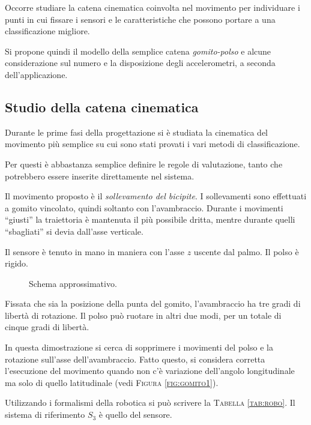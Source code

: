 Occorre studiare la catena cinematica coinvolta nel movimento
per individuare i punti in cui fissare i sensori
e le caratteristiche che possono portare a una classificazione migliore.

Si propone quindi il modello della semplice catena \emph{gomito-polso}
e alcune considerazione sul numero e la disposizione degli accelerometri,
a seconda dell'applicazione.

\subsection{Studio della catena cinematica}
\label{ssez:cat_cine}

Durante le prime fasi della progettazione
si è studiata la cinematica del movimento più semplice
su cui sono stati provati i vari metodi di classificazione.

Per questi è abbastanza semplice definire le regole di valutazione,
tanto che potrebbero essere inserite direttamente nel sistema.


Il movimento proposto è il \emph{sollevamento del bicipite}.
I sollevamenti sono effettuati a gomito vincolato,
quindi soltanto con l'avambraccio.
Durante i movimenti ``giusti'' la traiettoria \`e mantenuta
il pi\`u possibile dritta, mentre durante quelli ``sbagliati''
si devia dall'asse verticale.

Il sensore \`e tenuto in mano in maniera
con l'asse $z$ uscente dal palmo.
Il polso \`e rigido.

\begin{figure}
  \centering
	
  \caption{Schema approssimativo.}
  \label{fig:gomito2}
\end{figure}

Fissata che sia la posizione della punta del gomito,
l'avambraccio ha tre gradi di libert\`a di rotazione.
Il polso pu\`o ruotare in altri due modi,
per un totale di cinque gradi di libert\`a.

In questa dimostrazione si cerca di sopprimere
i movimenti del polso e la rotazione sull'asse dell'avambraccio.
Fatto questo, si considera corretta l'esecuzione del movimento
quando non c'\`e variazione dell'angolo longitudinale
ma solo di quello latitudinale (vedi \textsc{Figura \ref{fig:gomito1}}).

Utilizzando i formalismi della robotica
si pu\`o scrivere la \textsc{Tabella \ref{tab:robo}}.
Il sistema di riferimento $S_{3}$ \`e quello del sensore.

